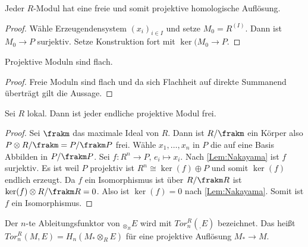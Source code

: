 \begin{Satz} Jeder \(R\)-Modul hat eine freie und somit projektive homologische Auflösung.
	
	
\end{Satz}
\begin{proof}
	Wähle Erzeugendensystem \((x_i)_{i\in I}\) und setze \(M_0=R^{(I)}\). 
	Dann ist \(M_0\to P\) surjektiv. Setze Konstruktion fort mit \(\ker(M_0\to P\).
\end{proof}
\begin{Lemma}
	Projektive Moduln sind flach.
\end{Lemma}
\begin{proof}
	Freie Moduln sind flach und da sich Flachheit auf direkte Summanend überträgt gilt die Aussage.
\end{proof}
\begin{Satz} Sei \(R\) lokal. Dann ist jeder endliche projektive Modul frei.
	
\end{Satz}
\begin{proof}
	Sei \(\frakm\) das maximale Ideal von \(R\). Dann ist 
	\(R/\frakm\) ein Körper also \(P\otimes R/\frakm=P/\frakm P\) frei.
	Wähle \(x_1,\dots,x_n\) in \(P\) die auf eine Basis Abbilden in \(P/\frakm P\).
	Sei \(f\colon R^n\to P,\, e_i\mapsto x_i\). Nach \cref{Lem:Nakayama} ist \(f\) surjektiv.
	Es ist weil \(P\) projektiv ist \(R^n\cong \ker(f)\oplus P\) und somit \(\ker(f)\) endlich erzeugt.
	Da \(f\) ein Isomorphismus ist über \(R/\frakm R\) ist \(\ker(f)\otimes R/\frakm R=0\). Also ist \(\ker(f)=0\) nach \cref{Lem:Nakayama}.
	Somit ist \(f\) ein Isomorphismus.
\end{proof}
\begin{Def} Der \(n\)-te Ableitungsfunktor von \(_\otimes_R E\) wird mit \(Tor_n^R(_,E)\) bezeichnet.
	Das heißt \(Tor_n^R(M,E)=H_n(M_*\otimes_R E)\) für eine projektive Auflösung \(M_*\to M\).
	
\end{Def}
